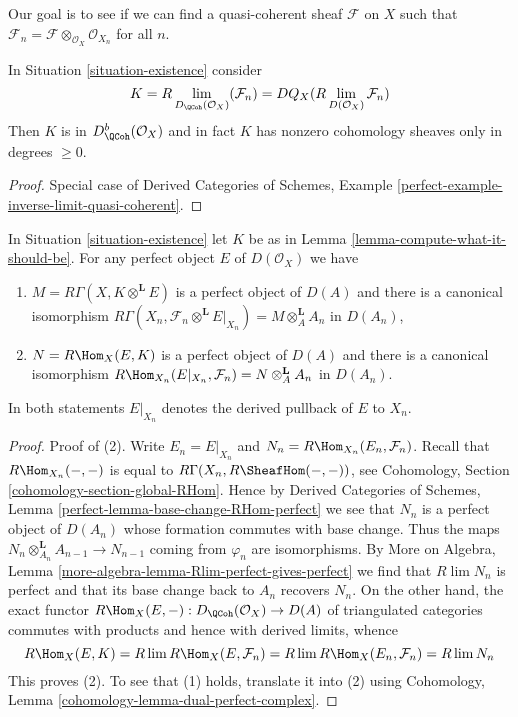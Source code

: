 \noindent
Our goal is to see if we can find a quasi-coherent sheaf $\mathcal{F}$
on $X$ such that
$\mathcal{F}_n = \mathcal{F} \otimes_{\mathcal{O}_X} \mathcal{O}_{X_n}$
for all $n$.

\begin{lemma}
\label{lemma-compute-what-it-should-be}
In Situation \ref{situation-existence} consider
$$
K = R\lim_{D_\QCoh(\mathcal{O}_X)}(\mathcal{F}_n) =
DQ_X(R\lim_{D(\mathcal{O}_X)}\mathcal{F}_n)
$$
Then $K$ is in $D^b_{\QCoh}(\mathcal{O}_X)$ and in fact
$K$ has nonzero cohomology sheaves only in degrees $\geq 0$.
\end{lemma}

\begin{proof}
Special case of
Derived Categories of Schemes, Example
\ref{perfect-example-inverse-limit-quasi-coherent}.
\end{proof}

\begin{lemma}
\label{lemma-compute-against-perfect}
In Situation \ref{situation-existence} let $K$ be as in
Lemma \ref{lemma-compute-what-it-should-be}. For any perfect
object $E$ of $D(\mathcal{O}_X)$ we have
\begin{enumerate}
\item $M = R\Gamma(X, K \otimes^\mathbf{L} E)$ is a perfect object of $D(A)$
and there is a canonical isomorphism
$R\Gamma(X_n, \mathcal{F}_n \otimes^\mathbf{L} E|_{X_n}) =
M \otimes_A^\mathbf{L} A_n$
in $D(A_n)$,
\item $N = R\Hom_X(E, K)$ is a perfect object of $D(A)$
and there is a canonical isomorphism
$R\Hom_{X_n}(E|_{X_n}, \mathcal{F}_n) = N \otimes_A^\mathbf{L} A_n$
in $D(A_n)$.
\end{enumerate}
In both statements $E|_{X_n}$ denotes the derived pullback
of $E$ to $X_n$.
\end{lemma}

\begin{proof}
Proof of (2). Write $E_n = E|_{X_n}$ and
$N_n = R\Hom_{X_n}(E_n, \mathcal{F}_n)$.
Recall that $R\Hom_{X_n}(-, -)$ is equal to
$R\Gamma(X_n, R\SheafHom(-, -))$, see
Cohomology, Section \ref{cohomology-section-global-RHom}.
Hence by Derived Categories of Schemes, Lemma
\ref{perfect-lemma-base-change-RHom-perfect}
we see that $N_n$ is a perfect object of $D(A_n)$
whose formation commutes with base change. Thus the maps
$N_n \otimes_{A_n}^\mathbf{L} A_{n - 1} \to N_{n - 1}$
coming from $\varphi_n$ are isomorphisms.
By More on Algebra, Lemma \ref{more-algebra-lemma-Rlim-perfect-gives-perfect}
we find that $R\lim N_n$ is perfect and
that its base change back to $A_n$ recovers $N_n$.
On the other hand, the exact functor
$R\Hom_X(E, -) : D_\QCoh(\mathcal{O}_X) \to D(A)$
of triangulated categories commutes with products
and hence with derived limits, whence
$$
R\Hom_X(E, K) =
R\lim R\Hom_X(E, \mathcal{F}_n) =
R\lim R\Hom_X(E_n, \mathcal{F}_n) =
R\lim N_n
$$
This proves (2). To see that (1) holds, translate it into (2)
using Cohomology, Lemma \ref{cohomology-lemma-dual-perfect-complex}.
\end{proof}

